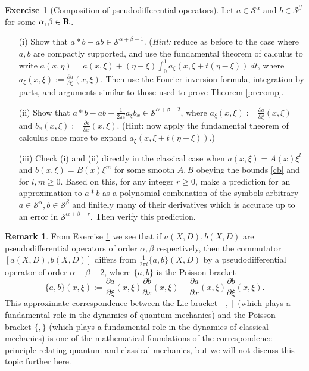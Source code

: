 \documentclass[11pt]{article}
\theoremstyle{definition}
\newtheorem{exercise}[theorem]{Exercise}
\newtheorem{remark}[theorem]{Remark}
\begin{document}
\begin{exercise}[Composition of pseudodifferential operators]
 \label{comp-p} Let \({a \in {\mathcal S}^\alpha}\) and \({b \in {\mathcal S}^\beta}\) for some \({\alpha,\beta \in {\bf R}}\). 
\begin{itemize}

\item[(i)] Show that \({a \ast b - ab \in {\mathcal S}^{\alpha+\beta-1}}\). (\emph{Hint:} reduce as before to the case where \({a,b}\) are compactly supported, and use the fundamental theorem of calculus to write \({a(x,\eta) = a(x,\xi) + (\eta-\xi) \int_0^1 a_\xi(x, \xi + t(\eta-\xi))\ dt}\), where \({a_\xi(x,\xi) := \frac{\partial a}{\partial \xi}(x,\xi)}\). Then use the Fourier inversion formula, integration by parts, and arguments similar to those used to prove Theorem \ref{precomp}. 
\item[(ii)] Show that \({a \ast b - ab - \frac{1}{2\pi i} a_\xi b_x \in {\mathcal S}^{\alpha+\beta-2}}\), where \({a_\xi(x,\xi) := \frac{\partial a}{\partial \xi}(x,\xi)}\) and \({b_x(x,\xi) := \frac{\partial b}{\partial x}(x,\xi)}\). (Hint: now apply the fundamental theorem of calculus once more to expand \({a_\xi(x,\xi+t(\eta-\xi))}\).) 
\item[(iii)] Check (i) and (ii) directly in the classical case when \({a(x,\xi) = A(x) \xi^l}\) and \({b(x,\xi) = B(x) \xi^m}\) for some smooth \({A,B}\) obeying the bounds \eqref{cb} and for \({l,m \geq 0}\). Based on this, for any integer \({r \geq 0}\), make a prediction for an approximation to \({a \ast b}\) as a polynomial combination of the symbols arbitrary \({a \in {\mathcal S}^\alpha, b \in {\mathcal S}^\beta}\) and finitely many of their derivatives which is accurate up to an error in \({{\mathcal S}^{\alpha+\beta-r}}\). Then verify this prediction.


\end{itemize}

\end{exercise}
\begin{remark}
 \label{ph} From Exercise \ref{comp-p} we see that if \({a(X,D), b(X,D)}\) are pseudodifferential operators of order \({\alpha,\beta}\) respectively, then the commutator \({[a(X,D),b(X,D)]}\) differs from \({\frac{1}{2\pi i} \{a,b\}(X,D)}\) by a pseudodifferential operator of order \({\alpha+\beta-2}\), where \({\{a,b\}}\) is the \href{https://en.wikipedia.org/wiki/Poisson_bracket}{Poisson bracket} 
\[\displaystyle  \{a,b\}(x,\xi) := \frac{\partial a}{\partial \xi}(x,\xi) \frac{\partial b}{\partial x}(x,\xi) - \frac{\partial a}{\partial x}(x,\xi) \frac{\partial b}{\partial \xi}(x,\xi).\]
 This approximate correspondence between the Lie bracket \({[,]}\) (which plays a fundamental role in the dynamics of quantum mechanics) and the Poisson bracket \({\{,\}}\) (which plays a fundamental role in the dynamics of classical mechanics) is one of the mathematical foundations of the \href{https://en.wikipedia.org/wiki/Correspondence_principle}{correspondence principle} relating quantum and classical mechanics, but we will not discuss this topic further here. 
\end{remark}
\end{document}

